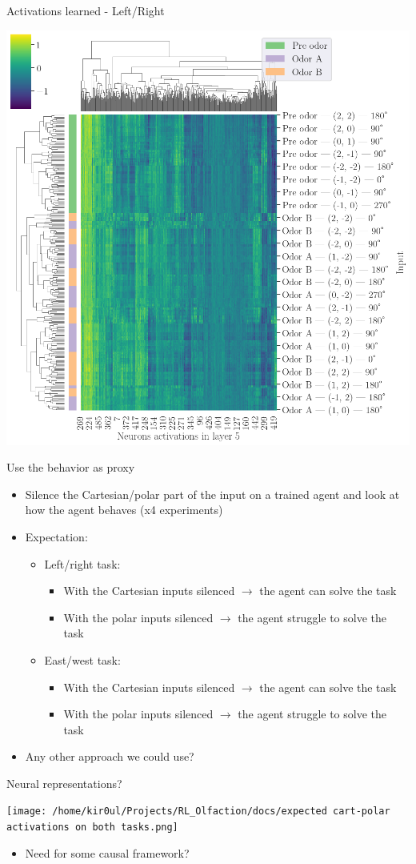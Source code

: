 \documentclass[bigger]{beamer}
\begin{document}
\begin{frame}[label={sec:org3530d2a}]{Activations learned - Left/Right}
\begin{center}
\includegraphics[height=0.9\textheight]{img/activations-learned-LeftRight.png}
\end{center}
\end{frame}
\begin{frame}[<+->][label={sec:orged4b1fd}]{Use the behavior as proxy}
\begin{itemize}
\item Silence the Cartesian/polar part of the input on a trained agent and look at how the agent behaves (x4 experiments)
\item Expectation:
\begin{itemize}
\item Left/right task:
\begin{itemize}
\item With the Cartesian inputs silenced \(\to\) the agent can solve the task
\item With the polar inputs silenced \(\to\) the agent struggle to solve the task
\end{itemize}
\item East/west task:
\begin{itemize}
\item With the Cartesian inputs silenced \(\to\) the agent can solve the task
\item With the polar inputs silenced \(\to\) the agent struggle to solve the task
\end{itemize}
\end{itemize}
\item Any other approach we could use?
\end{itemize}
\end{frame}
\begin{frame}[label={sec:org75b43c3}]{Neural representations?}
\begin{center}
\texttt{[image: /home/kir0ul/Projects/RL\_Olfaction/docs/expected cart-polar activations on both tasks.png]}
\end{center}
\begin{itemize}
\item Need for some causal framework?
\end{itemize}
\end{frame}
\end{document}
